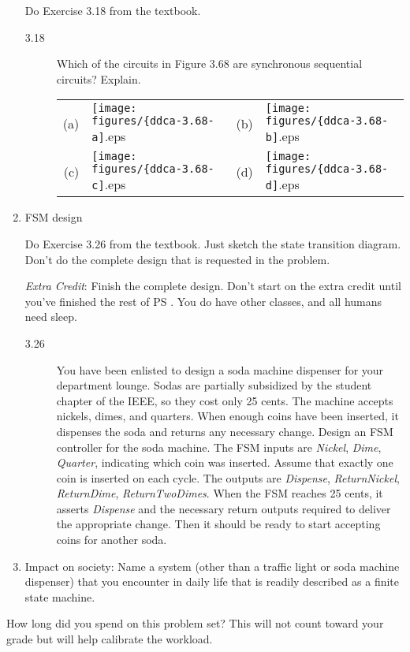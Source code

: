 \documentclass{e85}
\begin{document}
\begin{enumerate}
  Do Exercise 3.18 from the textbook.
  \begin{description}
  \item[3.18] Which of the circuits in Figure 3.68 are synchronous
    sequential circuits?  Explain.
    \begin{center}
      \begin{tabu}{rl@{\qquad}rl}
        (a)&\texttt{[image: figures/\{ddca-3.68-a]}.eps}&
        (b)&\texttt{[image: figures/\{ddca-3.68-b]}.eps}\\[1em]
        (c)&\texttt{[image: figures/\{ddca-3.68-c]}.eps}&
        (d)&\texttt{[image: figures/\{ddca-3.68-d]}.eps}
      \end{tabu}
    \end{center}
    \begin{solution}
    \end{solution}
  \end{description}

\item FSM design

  Do Exercise 3.26 from the textbook.  Just sketch the state
  transition diagram.  Don't do the complete design that is requested
  in the problem.

  \textit{Extra Credit}: Finish the complete design.  Don't start on
  the extra credit until you've finished the rest of PS \theps.  You
  do have other classes, and all humans need sleep.
  \begin{description}
  \item[3.26] You have been enlisted to design a soda machine
    dispenser for your department lounge.  Sodas are partially
    subsidized by the student chapter of the IEEE, so they cost only
    25 cents.  The machine accepts nickels, dimes, and quarters.  When
    enough coins have been inserted, it dispenses the soda and returns
    any necessary change.  Design an FSM controller for the soda
    machine.  The FSM inputs are \textit{Nickel}, \textit{Dime},
    \textit{Quarter}, indicating which coin was inserted.  Assume that
    exactly one coin is inserted on each cycle.  The outputs are
    \textit{Dispense}, \textit{ReturnNickel}, \textit{ReturnDime},
    \textit{ReturnTwoDimes}.  When the FSM reaches 25 cents, it
    asserts \textit{Dispense} and the necessary return outputs
    required to deliver the appropriate change.  Then it should be
    ready to start accepting coins for another soda.
    \begin{solution}
    \end{solution}
  \end{description}

\item Impact on society: Name a system (other than a traffic light or
  soda machine dispenser) that you encounter in daily life that is
  readily described as a finite state machine.
  \begin{solution}
  \end{solution}
\end{enumerate}

How long did you spend on this problem set?  This will not count
toward your grade but will help calibrate the workload.
\begin{solution}
\end{solution}
\end{document}
